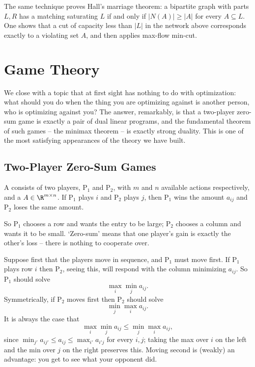 \documentclass[a4paper]{scrartcl}
\begin{document}
\begin{remark}
    The same technique proves Hall's marriage theorem: a bipartite graph with parts $L, R$ has a matching saturating $L$ if and only if $|N(A)| \geq |A|$ for every $A \subseteq L$. One shows that a cut of capacity less than $|L|$ in the network above corresponds exactly to a violating set $A$, and then applies max-flow min-cut.
\end{remark}

\section{Game Theory}

We close with a topic that at first sight has nothing to do with optimization: what should you do when the thing you are optimizing against is another person, who is optimizing against you? The answer, remarkably, is that a two-player zero-sum game is exactly a pair of dual linear programs, and the fundamental theorem of such games -- the minimax theorem -- is exactly strong duality. This is one of the most satisfying appearances of the theory we have built.

\subsection{Two-Player Zero-Sum Games}

\begin{definition}
    A  consists of two players, $\mathrm{P}_1$ and $\mathrm{P}_2$, with $m$ and $n$ available actions respectively, and a  $A \in \R^{m\times n}$. If $\mathrm{P}_1$ plays $i$ and $\mathrm{P}_2$ plays $j$, then $\mathrm{P}_1$ wins the amount $a_{ij}$ and $\mathrm{P}_2$ loses the same amount.
\end{definition}

So $\mathrm{P}_1$ chooses a row and wants the entry to be large; $\mathrm{P}_2$ chooses a column and wants it to be small. `Zero-sum' means that one player's gain is exactly the other's loss -- there is nothing to cooperate over.

Suppose first that the players move in sequence, and $\mathrm{P}_1$ must move first. If $\mathrm{P}_1$ plays row $i$ then $\mathrm{P}_2$, seeing this, will respond with the column minimizing $a_{ij}$. So $\mathrm{P}_1$ should solve
$$
\max_{i}\min_j a_{ij}.
$$
Symmetrically, if $\mathrm{P}_2$ moves first then $\mathrm{P}_2$ should solve
$$
\min_j\max_i a_{ij}.
$$
It is always the case that
$$
\max_i\min_j a_{ij} \leq \min_j\max_i a_{ij},
$$
since $\min_{j'}a_{ij'} \leq a_{ij} \leq \max_{i'}a_{i'j}$ for every $i, j$; taking the max over $i$ on the left and the min over $j$ on the right preserves this. Moving second is (weakly) an advantage: you get to see what your opponent did.
\end{document}
